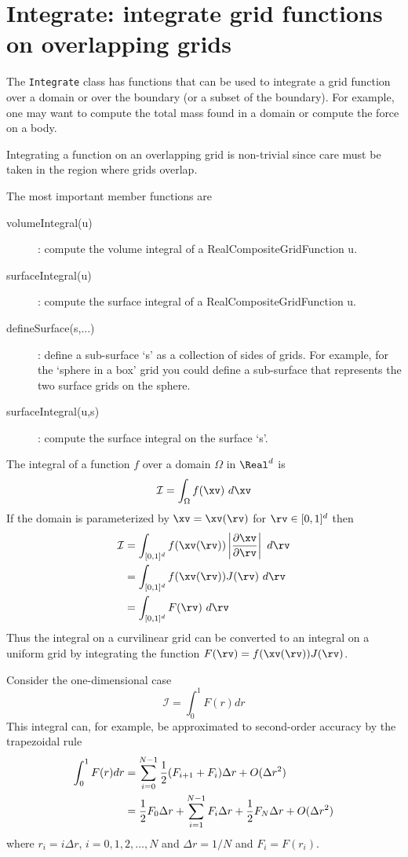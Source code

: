 \section{Integrate: integrate grid functions on overlapping grids} \label{Integrate}

The {\tt Integrate} class has functions that can be used to integrate a grid
function over a domain or over the boundary (or a subset of the boundary).
For example, one may want to compute the total mass found in a domain 
or compute the force on a body.

Integrating a function on an overlapping grid is non-trivial since care must
be taken in the region where grids overlap.


The most important member functions are
\begin{description}
  \item[volumeIntegral(u)] : compute the volume integral of a RealCompositeGridFunction u.
  \item[surfaceIntegral(u)] : compute the surface integral of a RealCompositeGridFunction u.
  \item[defineSurface(s,...)] : define a sub-surface `s' as a collection of sides of grids. For example,
     for the `sphere in a box' grid you could define a sub-surface that represents the two surface
     grids on the sphere.
  \item[surfaceIntegral(u,s)] : compute the surface integral on the surface `s'.
\end{description}


The integral of a function $f$ over a domain $\Omega$ in $\Real^d$ is
\[
  \mathcal{I} = \int_\Omega f(\xv) ~d\xv
\]
If the domain is parameterized by $\xv=\xv(\rv)$ for $\rv\in [0,1]^d$ then
\begin{align*}
  \mathcal{I} &= \int_{[0,1]^d}  f(\xv(\rv)) \left\vert {\partial \xv \over \partial \rv}\right\vert ~d\rv \\
              &= \int_{[0,1]^d}  f(\xv(\rv)) J(\rv) ~d\rv \\
              &= \int_{[0,1]^d}  F(\rv)~d\rv
\end{align*}
Thus the integral on a curvilinear grid can be converted to an integral on a uniform grid
by integrating the function $F(\rv) = f(\xv(\rv)) J(\rv)$.


Consider the one-dimensional case
\[
    \mathcal{I} = \int_0^1 F(r) dr
\]
This integral can, for example, be approximated to second-order accuracy by the trapezoidal rule
\begin{align*}
    \int_0^1 F(r) dr &= \sum_{i=0}^{N-1}  {1\over 2}( F_{i+1} + F_i ) \Delta r + O(\Delta r^2) \\
                     &= {1\over 2} F_0\Delta r + \sum_{i=1}^{N-1} F_i \Delta r + {1\over 2} F_N\Delta r+ O(\Delta r^2)
\end{align*}
where $r_i=i\Delta r$, $i=0,1,2,\ldots,N$ and $\Delta r = 1/N$ and $F_i=F(r_i)$.




